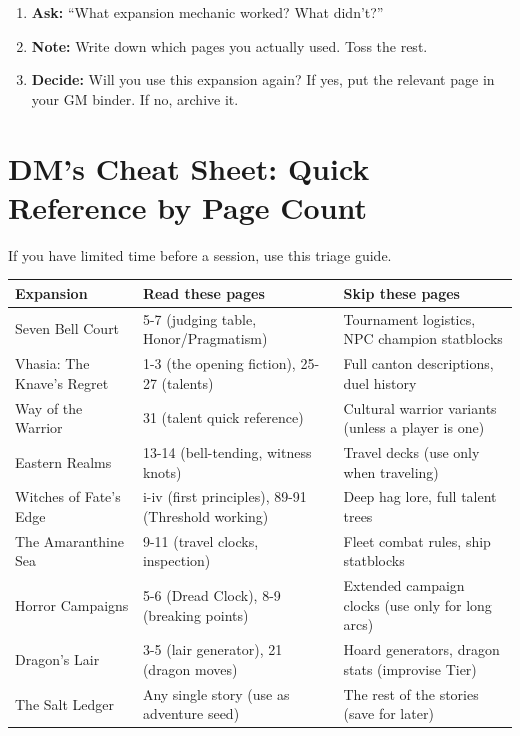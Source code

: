 \begin{enumerate}
\item \textbf{Ask:} “What expansion mechanic worked? What didn't?”
\item \textbf{Note:} Write down which pages you actually used. Toss the rest.
\item \textbf{Decide:} Will you use this expansion again? If yes, put the relevant page in your GM binder. If no, archive it.
\end{enumerate}

\section{DM's Cheat Sheet: Quick Reference by Page Count}

If you have limited time before a session, use this triage guide.

\begin{longtable}{p{4cm}|p{4cm}|p{4cm}}
\hline
\textbf{Expansion} & \textbf{Read these pages} & \textbf{Skip these pages} \\
\hline
Seven Bell Court & 5-7 (judging table, Honor/Pragmatism) & Tournament logistics, NPC champion statblocks \\
\hline
Vhasia: The Knave's Regret & 1-3 (the opening fiction), 25-27 (talents) & Full canton descriptions, duel history \\
\hline
Way of the Warrior & 31 (talent quick reference) & Cultural warrior variants (unless a player is one) \\
\hline
Eastern Realms & 13-14 (bell-tending, witness knots) & Travel decks (use only when traveling) \\
\hline
Witches of Fate's Edge & i-iv (first principles), 89-91 (Threshold working) & Deep hag lore, full talent trees \\
\hline
The Amaranthine Sea & 9-11 (travel clocks, inspection) & Fleet combat rules, ship statblocks \\
\hline
Horror Campaigns & 5-6 (Dread Clock), 8-9 (breaking points) & Extended campaign clocks (use only for long arcs) \\
\hline
Dragon's Lair & 3-5 (lair generator), 21 (dragon moves) & Hoard generators, dragon stats (improvise Tier) \\
\hline
The Salt Ledger & Any single story (use as adventure seed) & The rest of the stories (save for later) \\
\hline
\end{longtable}

